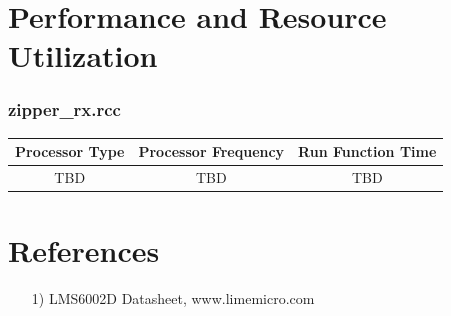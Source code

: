 \documentclass{article}
\def\comp{zipper\_rx}
\begin{document}
\section*{Performance and Resource Utilization}
\subsubsection*{\comp.rcc}
\begin{scriptsize}
	\begin{tabular}{|c|c|c|}
		\hline
		\rowcolor{blue}
		Processor Type & Processor Frequency & Run Function Time \\
		\hline
		TBD            & TBD                 & TBD               \\
		\hline
	\end{tabular}
\end{scriptsize}


\section*{References}
\begin{itemize}
	\item[1)] LMS6002D Datasheet, www.limemicro.com
\end{itemize}
\end{document}
